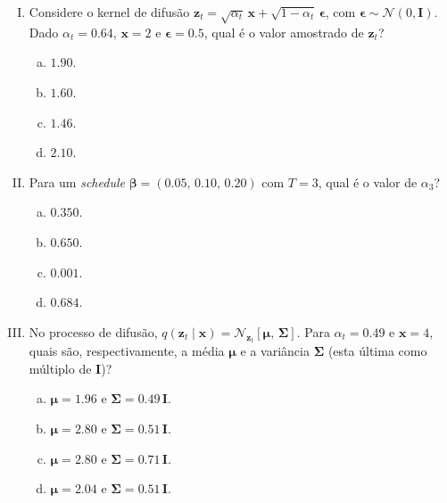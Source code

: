 \documentclass{dlproblemset}
\begin{document}
\begin{enumerate}[I)]

\item Considere o kernel de difusão $\mathbf{z}_t = \sqrt{\alpha_t}\, \mathbf{x} + \sqrt{1 - \alpha_t}\, \boldsymbol{\epsilon}$, com $\boldsymbol{\epsilon} \sim \mathcal{N}(0, \mathbf{I})$. Dado $\alpha_t = 0.64$, $\mathbf{x} = 2$ e $\boldsymbol{\epsilon} = 0.5$, qual é o valor amostrado de $\mathbf{z}_t$?
\begin{enumerate}[(a)]
    \item $1.90$.
    \item $1.60$.
    \item $1.46$.
    \item $2.10$.
\end{enumerate}

\item Para um \textit{schedule} $\boldsymbol{\beta} = (0.05,\, 0.10,\, 0.20)$ com $T = 3$, qual é o valor de $\alpha_3$?
\begin{enumerate}[(a)]
    \item $0.350$.
    \item $0.650$.
    \item $0.001$.
    \item $0.684$.
\end{enumerate}

\item No processo de difusão, $q(\mathbf{z}_t \mid \mathbf{x}) = \mathcal{N}_{\mathbf{z}_t}[\boldsymbol{\mu},\, \boldsymbol{\Sigma}]$. Para $\alpha_t = 0.49$ e $\mathbf{x} = 4$, quais são, respectivamente, a média $\boldsymbol{\mu}$ e a variância $\boldsymbol{\Sigma}$ (esta última como múltiplo de $\mathbf{I}$)?
\begin{enumerate}[(a)]
    \item $\boldsymbol{\mu} = 1.96$ e $\boldsymbol{\Sigma} = 0.49\,\mathbf{I}$.
    \item $\boldsymbol{\mu} = 2.80$ e $\boldsymbol{\Sigma} = 0.51\,\mathbf{I}$.
    \item $\boldsymbol{\mu} = 2.80$ e $\boldsymbol{\Sigma} = 0.71\,\mathbf{I}$.
    \item $\boldsymbol{\mu} = 2.04$ e $\boldsymbol{\Sigma} = 0.51\,\mathbf{I}$.
\end{enumerate}


\end{enumerate}
\end{document}
